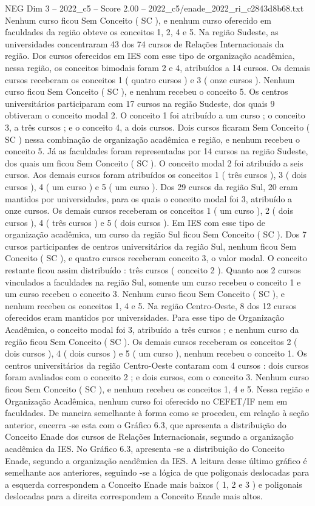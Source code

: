 \begin{textsample}{NEG Dim 3 – 2022\_c5 – Score 2.00 – 2022\_c5/enade\_2022\_ri\_c2843d8b68.txt}
Nenhum curso ficou Sem Conceito ( SC ), e nenhum curso oferecido em faculdades da região obteve os conceitos 1, 2, 4 e 5.
Na região Sudeste, as universidades concentraram 43 dos 74 cursos de Relações Internacionais da região.
Dos cursos oferecidos em IES com esse tipo de organização acadêmica, nessa região, os conceitos bimodais foram 2 e 4, atribuídos a 14 cursos.
Os demais cursos receberam os conceitos 1 ( quatro cursos ) e 3 ( onze cursos ).
Nenhum curso ficou Sem Conceito ( SC ), e nenhum recebeu o conceito 5.
Os centros universitários participaram com 17 cursos na região Sudeste, dos quais 9 obtiveram o conceito modal 2.
O conceito 1 foi atribuído a um curso ; o conceito 3, a três cursos ; e o conceito 4, a dois cursos.
Dois cursos ficaram Sem Conceito ( SC ) nessa combinação de organização acadêmica e região, e nenhum recebeu o conceito 5.
Já as faculdades foram representadas por 14 cursos na região Sudeste, dos quais um ficou Sem Conceito ( SC ).
O conceito modal 2 foi atribuído a seis cursos.
Aos demais cursos foram atribuídos os conceitos 1 ( três cursos ), 3 ( dois cursos ), 4 ( um curso ) e 5 ( um curso ).
Dos 29 cursos da região Sul, 20 eram mantidos por universidades, para os quais o conceito modal foi 3, atribuído a onze cursos.
Os demais cursos receberam os conceitos 1 ( um curso ), 2 ( dois cursos ), 4 ( três cursos ) e 5 ( dois cursos ).
Em IES com esse tipo de organização acadêmica, um curso da região Sul ficou Sem Conceito ( SC ).
Dos 7 cursos participantes de centros universitários da região Sul, nenhum ficou Sem Conceito ( SC ), e quatro cursos receberam conceito 3, o valor modal.
O conceito restante ficou assim distribuído : três cursos ( conceito 2 ).
Quanto aos 2 cursos vinculados a faculdades na região Sul, somente um curso recebeu o conceito 1 e um curso recebeu o conceito 3.
Nenhum curso ficou Sem Conceito ( SC ), e nenhum recebeu os conceitos 1, 4 e 5.
Na região Centro-Oeste, 8 dos 12 cursos oferecidos eram mantidos por universidades.
Para esse tipo de Organização Acadêmica, o conceito modal foi 3, atribuído a três cursos ; e nenhum curso da região ficou Sem Conceito ( SC ).
Os demais cursos receberam os conceitos 2 ( dois cursos ), 4 ( dois cursos ) e 5 ( um curso ), nenhum recebeu o conceito 1.
Os centros universitários da região Centro-Oeste contaram com 4 cursos : dois cursos foram avaliados com o conceito 2 ; e dois cursos, com o conceito 3.
Nenhum curso ficou Sem Conceito ( SC ), e nenhum recebeu os conceitos 1, 4 e 5.
Nessa região e Organização Acadêmica, nenhum curso foi oferecido no CEFET/IF nem em faculdades.
De maneira semelhante à forma como se procedeu, em relação à seção anterior, encerra -se esta com o Gráfico 6.3, que apresenta a distribuição do Conceito Enade dos cursos de Relações Internacionais, segundo a organização acadêmica da IES.
No Gráfico 6.3, apresenta -se a distribuição do Conceito Enade, segundo a organização acadêmica da IES.
A leitura desse último gráfico é semelhante aos anteriores, seguindo -se a lógica de que poligonais deslocadas para a esquerda correspondem a Conceito Enade mais baixos ( 1, 2 e 3 ) e poligonais deslocadas para a direita correspondem a Conceito Enade mais altos.

\end{textsample}
